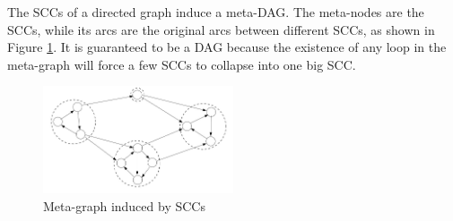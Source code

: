 The SCCs of a directed graph induce a meta-DAG. The meta-nodes are the SCCs, while its arcs are the original arcs between different SCCs, as shown in Figure \ref{metagraph}. It is guaranteed to be a DAG because the existence of any loop in the meta-graph will force a few SCCs to collapse into one big SCC.
\begin{figure}[ht]
\centering
\includegraphics[width=0.5\textwidth]{metagraph.jpg}
\caption{Meta-graph induced by SCCs}\label{metagraph}
\end{figure}

